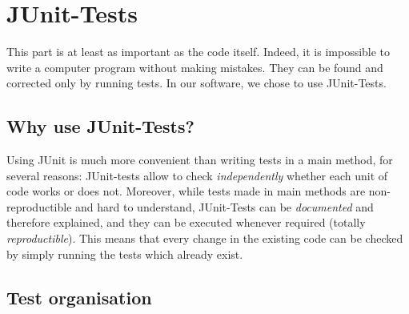 \section{JUnit-Tests}
This part is at least as important as the code itself. Indeed, it is impossible to write a computer program without making mistakes. They can be found and corrected only by running tests. In our software, we chose to use JUnit-Tests.

\subsection{Why use JUnit-Tests?}
\label{sub:why_use_JUnih-Tests}

Using JUnit is much more convenient than writing tests in a main method, for several reasons: JUnit-tests allow to check \textit{independently} whether each unit of code works or does not. Moreover, while tests made in main methods are non-reproductible and hard to understand, JUnit-Tests can be \textit{documented} and therefore explained, and they can be executed whenever required (totally \textit{reproductible}). This means that every change in the existing code can be checked by simply running the tests which already exist.

\subsection{Test organisation}
\label{sub:test_organisation}

